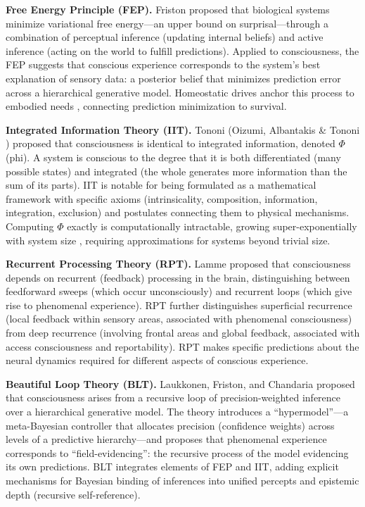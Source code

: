 \textbf{Free Energy Principle (FEP).} Friston \cite{friston2010} proposed that biological systems minimize variational free energy---an upper bound on surprisal---through a combination of perceptual inference (updating internal beliefs) and active inference (acting on the world to fulfill predictions). Applied to consciousness, the FEP suggests that conscious experience corresponds to the system's best explanation of sensory data: a posterior belief that minimizes prediction error across a hierarchical generative model. Homeostatic drives anchor this process to embodied needs \cite{pezzulo2015}, connecting prediction minimization to survival.

\textbf{Integrated Information Theory (IIT).} Tononi \cite{tononi2004,tononi2008} (Oizumi, Albantakis \& Tononi \cite{oizumi2014}) proposed that consciousness is identical to integrated information, denoted $\Phi$ (phi). A system is conscious to the degree that it is both differentiated (many possible states) and integrated (the whole generates more information than the sum of its parts). IIT is notable for being formulated as a mathematical framework with specific axioms (intrinsicality, composition, information, integration, exclusion) and postulates connecting them to physical mechanisms. Computing $\Phi$ exactly is computationally intractable, growing super-exponentially with system size \cite{tegmark2016}, requiring approximations for systems beyond trivial size.

\textbf{Recurrent Processing Theory (RPT).} Lamme \cite{lamme2006,lamme2010} proposed that consciousness depends on recurrent (feedback) processing in the brain, distinguishing between feedforward sweeps (which occur unconsciously) and recurrent loops (which give rise to phenomenal experience). RPT further distinguishes superficial recurrence (local feedback within sensory areas, associated with phenomenal consciousness) from deep recurrence (involving frontal areas and global feedback, associated with access consciousness and reportability). RPT makes specific predictions about the neural dynamics required for different aspects of conscious experience.

\textbf{Beautiful Loop Theory (BLT).} Laukkonen, Friston, and Chandaria \cite{laukkonen2025} proposed that consciousness arises from a recursive loop of precision-weighted inference over a hierarchical generative model. The theory introduces a ``hypermodel''---a meta-Bayesian controller that allocates precision (confidence weights) across levels of a predictive hierarchy---and proposes that phenomenal experience corresponds to ``field-evidencing'': the recursive process of the model evidencing its own predictions. BLT integrates elements of FEP and IIT, adding explicit mechanisms for Bayesian binding of inferences into unified percepts and epistemic depth (recursive self-reference).

